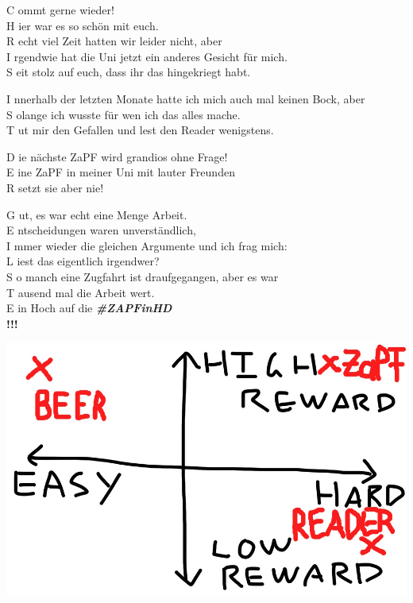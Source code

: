 
\vspace{4cm}

\begin{center}
  C ommt gerne wieder! \\
  H ier war es so schön mit euch. \\
  R echt viel Zeit hatten wir leider nicht, aber \\
  I rgendwie hat die Uni jetzt ein anderes Gesicht für mich. \\
  S eit stolz auf euch, dass ihr das hingekriegt habt.
\begin{center}

\end{center}
  I nnerhalb der letzten Monate hatte ich mich auch mal keinen Bock, aber \\
  S olange ich wusste für wen ich das alles mache. \\
  T ut mir den Gefallen und lest den Reader wenigstens.
\begin{center}

\end{center}
  D ie nächste ZaPF wird grandios ohne Frage! \\
  E ine ZaPF in meiner Uni mit lauter Freunden \\
  R setzt sie aber nie!
\begin{center}

\end{center}
  G ut, es war echt eine Menge Arbeit. \\
  E ntscheidungen waren unverständlich, \\
  I mmer wieder die gleichen Argumente und ich frag mich: \\
  L iest das eigentlich irgendwer? \\
  S o manch eine Zugfahrt ist draufgegangen, aber es war \\
  T ausend mal die Arbeit wert. \\
  E in Hoch auf die \textbf{\textit{\#ZAPFinHD}} \\

  \textbf{!!!}

  \vspace{1cm}
  \includegraphics[scale=0.2]{bilder/readergraphic.jpg}

\end{center}

